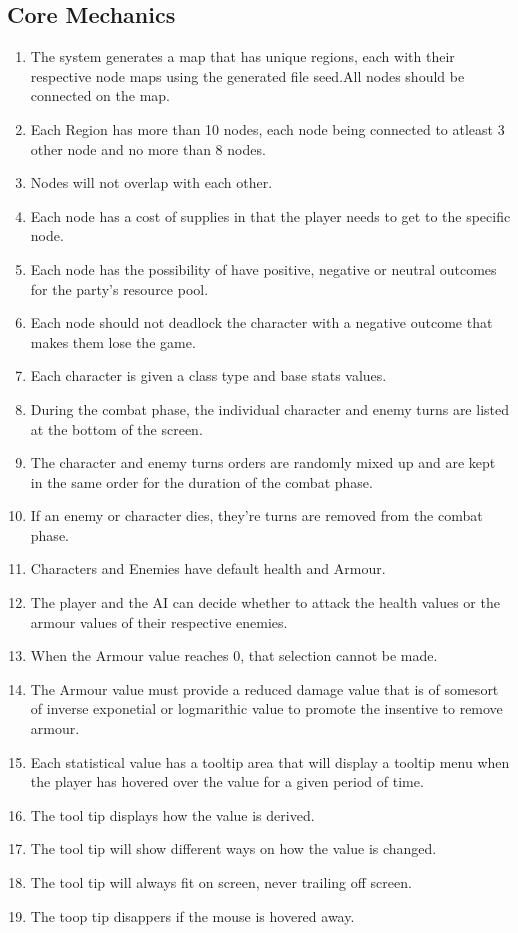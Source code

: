 \documentclass{article}
\begin{document}
\subsection{Core Mechanics}
\begin{enumerate}[{CMR}1. ]
	\item The system generates a map that has unique regions, each with their respective node maps using the generated file seed.All nodes should be connected on the map.
	\item Each Region has more than 10 nodes, each node being connected to atleast 3 other node and no more than 8 nodes.
	\item Nodes will not overlap with each other.
	\item Each node has a cost of supplies in that the player needs to get to the specific node.
	\item Each node has the possibility of have positive, negative or neutral outcomes for the party's resource pool.
	\item Each node should not deadlock the character with a negative outcome that makes them lose the game.

	\item Each character is given a class type and base stats values.
	\item During the combat phase, the individual character and enemy turns are listed at the bottom of the screen.
	\item The character and enemy turns orders are randomly mixed up and are kept in the same order for the duration of the combat phase.
	\item If an enemy or character dies, they're turns are removed from the combat phase.
	\item Characters and Enemies have default health and Armour.
	\item The player and the AI can decide whether to attack the health values or the armour values of their respective enemies.
	\item When the Armour value reaches 0, that selection cannot be made.
	\item The Armour value must provide a reduced damage value that is of somesort of inverse exponetial or logmarithic value to promote the insentive to remove armour.
	\item Each statistical value has a tooltip area that will display a tooltip menu when the player has hovered over the value for a given period of time.
	\item The tool tip displays how the value is derived.
	\item The tool tip will show different ways on how the value is changed.
	\item The tool tip will always fit on screen, never trailing off screen.
	\item The toop tip disappers if the mouse is hovered away.
\end{enumerate}
\end{document}
